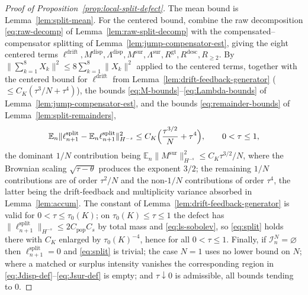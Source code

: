 \documentclass[a4paper,fleqn]{cas-sc}
\theoremstyle{definition}
\theoremstyle{remark}
\begin{document}
\begin{proof}[Proof of Proposition~\ref{prop:local-split-defect}]
The mean bound is Lemma~\ref{lem:split-mean}. For the centered bound, combine the raw
decomposition \eqref{eq:raw-decomp} of Lemma~\ref{lem:raw-split-decomp} with the
compensated--compensator splitting of Lemma~\ref{lem:jump-compensator-est}, giving the eight
centered terms
$\ell^{\mathrm{drift}},M^{\mathrm{disp}},\Lambda^{\mathrm{disp}},M^{\mathrm{sur}},\Lambda^{\mathrm{sur}},R^{\mathrm{gt}},R^{\mathrm{desc}},R_{\ge2}$.
By $\|\sum_{k=1}^8X_k\|^2\le8\sum_{k=1}^8\|X_k\|^2$ applied to the centered terms, together
with the centered bound for $\ell^{\mathrm{drift}}$ from Lemma~\ref{lem:drift-feedback-generator}
($\le C_K(\tau^3/N+\tau^4)$), the bounds \eqref{eq:M-bounds}--\eqref{eq:Lambda-bounds} of
Lemma~\ref{lem:jump-compensator-est}, and the bounds \eqref{eq:remainder-bounds} of
Lemma~\ref{lem:split-remainders},
\[
\mathbb E_n\|\ell^{\mathrm{split}}_{n+1}-\mathbb E_n\ell^{\mathrm{split}}_{n+1}\|_{H^{-s}}^2
\le C_K\Bigl(\frac{\tau^{3/2}}{N}+\tau^4\Bigr),
\qquad 0<\tau\le1,
\]
the dominant $1/N$ contribution being $\mathbb E_n\|M^{\mathrm{sur}}\|_{H^{-s}}^2\le C_K\tau^{3/2}/N$,
where the Brownian scaling $\sqrt{\tau-\theta}$ produces the exponent $3/2$; the remaining $1/N$
contributions are of order $\tau^2/N$ and the non-$1/N$ contributions of order $\tau^4$, the latter
being the drift-feedback and multiplicity variance absorbed in Lemma~\ref{lem:accum}. The constant of Lemma~\ref{lem:drift-feedback-generator} is valid for
$0<\tau\le\tau_0(K)$; on $\tau_0(K)\le\tau\le1$ the defect has
$\|\ell^{\mathrm{split}}_{n+1}\|_{H^{-s}}\le2C_{\mathrm{pop}}C_s$ by total mass and \eqref{eq:ls-sobolev},
so \eqref{eq:split} holds there with $C_K$ enlarged by $\tau_0(K)^{-4}$, hence for all
$0<\tau\le1$. Finally, if $\mathcal I^N_n=\varnothing$ then $\ell^{\mathrm{split}}_{n+1}=0$ and
\eqref{eq:split} is trivial; the case $N=1$ uses no lower bound on $N$; where a matched or
surplus intensity vanishes the corresponding region in \eqref{eq:Jdisp-def}--\eqref{eq:Jsur-def}
is empty; and $\tau\downarrow0$ is admissible, all bounds tending to $0$.
\end{proof}
\end{document}
